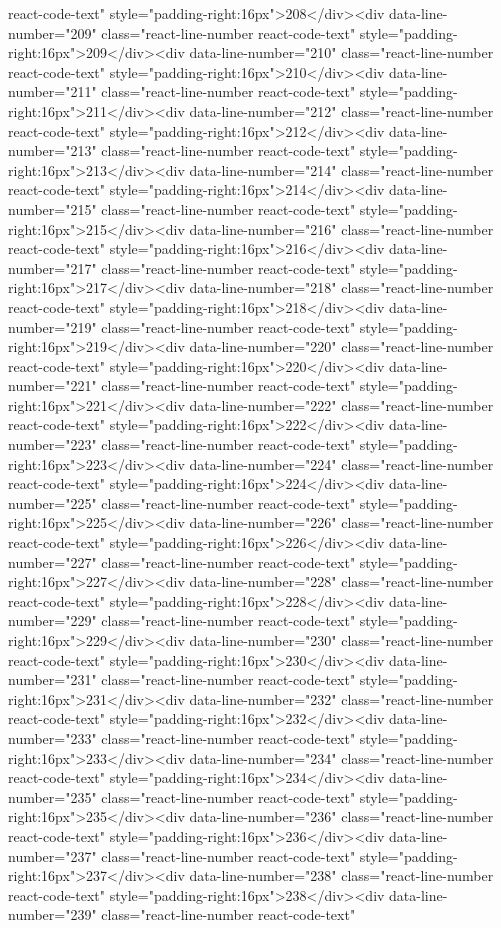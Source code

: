 {{{{{react-code-text" style="padding-right:16px">208</div><div data-line-number="209" class="react-line-number react-code-text" style="padding-right:16px">209</div><div data-line-number="210" class="react-line-number react-code-text" style="padding-right:16px">210</div><div data-line-number="211" class="react-line-number react-code-text" style="padding-right:16px">211</div><div data-line-number="212" class="react-line-number react-code-text" style="padding-right:16px">212</div><div data-line-number="213" class="react-line-number react-code-text" style="padding-right:16px">213</div><div data-line-number="214" class="react-line-number react-code-text" style="padding-right:16px">214</div><div data-line-number="215" class="react-line-number react-code-text" style="padding-right:16px">215</div><div data-line-number="216" class="react-line-number react-code-text" style="padding-right:16px">216</div><div data-line-number="217" class="react-line-number react-code-text" style="padding-right:16px">217</div><div data-line-number="218" class="react-line-number react-code-text" style="padding-right:16px">218</div><div data-line-number="219" class="react-line-number react-code-text" style="padding-right:16px">219</div><div data-line-number="220" class="react-line-number react-code-text" style="padding-right:16px">220</div><div data-line-number="221" class="react-line-number react-code-text" style="padding-right:16px">221</div><div data-line-number="222" class="react-line-number react-code-text" style="padding-right:16px">222</div><div data-line-number="223" class="react-line-number react-code-text" style="padding-right:16px">223</div><div data-line-number="224" class="react-line-number react-code-text" style="padding-right:16px">224</div><div data-line-number="225" class="react-line-number react-code-text" style="padding-right:16px">225</div><div data-line-number="226" class="react-line-number react-code-text" style="padding-right:16px">226</div><div data-line-number="227" class="react-line-number react-code-text" style="padding-right:16px">227</div><div data-line-number="228" class="react-line-number react-code-text" style="padding-right:16px">228</div><div data-line-number="229" class="react-line-number react-code-text" style="padding-right:16px">229</div><div data-line-number="230" class="react-line-number react-code-text" style="padding-right:16px">230</div><div data-line-number="231" class="react-line-number react-code-text" style="padding-right:16px">231</div><div data-line-number="232" class="react-line-number react-code-text" style="padding-right:16px">232</div><div data-line-number="233" class="react-line-number react-code-text" style="padding-right:16px">233</div><div data-line-number="234" class="react-line-number react-code-text" style="padding-right:16px">234</div><div data-line-number="235" class="react-line-number react-code-text" style="padding-right:16px">235</div><div data-line-number="236" class="react-line-number react-code-text" style="padding-right:16px">236</div><div data-line-number="237" class="react-line-number react-code-text" style="padding-right:16px">237</div><div data-line-number="238" class="react-line-number react-code-text" style="padding-right:16px">238</div><div data-line-number="239" class="react-line-number react-code-text" }}}}}
